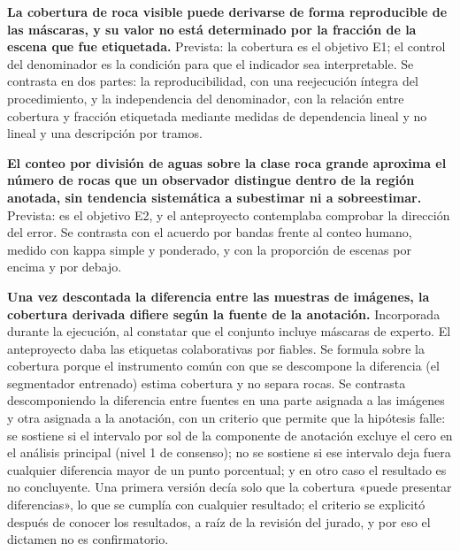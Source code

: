 \begin{description}[leftmargin=1.2cm, style=nextline]

\item[H1.] \textbf{La cobertura de roca visible puede derivarse de forma reproducible de las
  máscaras, y su valor no está determinado por la fracción de la escena que fue etiquetada.}
  Prevista: la cobertura es el objetivo E1; el control del denominador es la condición para
  que el indicador sea interpretable. Se contrasta en dos partes: la reproducibilidad, con una
  reejecución íntegra del procedimiento, y la independencia del denominador, con la relación
  entre cobertura y fracción etiquetada mediante medidas de dependencia lineal y no lineal y
  una descripción por tramos.

\item[H2.] \textbf{El conteo por división de aguas sobre la clase roca grande aproxima el número
  de rocas que un observador distingue dentro de la región anotada, sin tendencia sistemática
  a subestimar ni a sobreestimar.} Prevista: es el objetivo E2, y el anteproyecto contemplaba comprobar la
  dirección del error. Se contrasta con el acuerdo por bandas frente al conteo humano, medido
  con kappa simple y ponderado, y con la proporción de escenas por encima y por debajo.

\item[H3.] \textbf{Una vez descontada la diferencia entre las muestras de imágenes, la
  cobertura derivada difiere según la fuente de la anotación.}
  Incorporada durante la ejecución, al constatar que el conjunto incluye máscaras de experto.
  El anteproyecto daba las etiquetas colaborativas por fiables. Se formula sobre la cobertura porque el instrumento común con que se descompone la diferencia
(el segmentador entrenado) estima cobertura y no separa rocas. Se contrasta descomponiendo la
  diferencia entre fuentes en una parte asignada a las imágenes y otra asignada a la
  anotación, con un criterio que permite que la hipótesis falle: se sostiene si el intervalo
  por sol de la componente de anotación excluye el cero en el análisis principal (nivel 1 de
  consenso); no se sostiene si ese intervalo deja fuera cualquier diferencia mayor de un punto
  porcentual; y en otro caso el resultado es no concluyente. Una primera versión decía solo que
  la cobertura «puede presentar diferencias», lo que se cumplía con cualquier resultado; el
  criterio se explicitó después de conocer los resultados, a raíz de la revisión del jurado, y
  por eso el dictamen no es confirmatorio.


\end{description}
